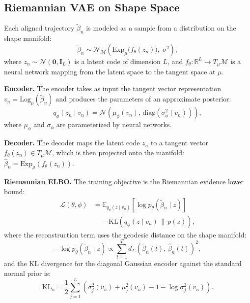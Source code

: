 \documentclass{article}
\begin{document}
\subsection{Riemannian VAE on Shape Space}
\label{sec:rvae}

Each aligned trajectory $\tilde{\beta}_n$ is modeled as a sample from a distribution on the shape manifold:
\begin{equation}
\tilde{\beta}_n \sim \mathcal{N}_{\mathcal{M}}\!\left(\mathrm{Exp}_\mu\!\big(f_\theta(z_n)\big),\; \sigma^2\right),
\end{equation}
where $z_n \sim \mathcal{N}(\mathbf{0}, \mathbf{I}_L)$ is a latent code of dimension $L$, and $f_\theta: \mathbb{R}^L \to T_\mu \mathcal{M}$ is a neural network mapping from the latent space to the tangent space at $\mu$.

\textbf{Encoder.} The encoder takes as input the tangent vector representation $v_n = \mathrm{Log}_\mu(\tilde{\beta}_n)$ and produces the parameters of an approximate posterior:
\begin{equation}
q_\phi(z_n \mid v_n) = \mathcal{N}\!\left(\mu_\phi(v_n),\, \mathrm{diag}(\sigma^2_\phi(v_n))\right),
\end{equation}
where $\mu_\phi$ and $\sigma_\phi$ are parameterized by neural networks.

\textbf{Decoder.} The decoder maps the latent code $z_n$ to a tangent vector $f_\theta(z_n) \in T_\mu \mathcal{M}$, which is then projected onto the manifold: $\hat{\beta}_n = \mathrm{Exp}_\mu(f_\theta(z_n))$.

\textbf{Riemannian ELBO.} The training objective is the Riemannian evidence lower bound:
\begin{equation}
\begin{aligned}
\mathcal{L}(\theta,\phi) &= \mathbb{E}_{q_\phi(z \mid v_n)}\!\left[\log p_\theta(\tilde{\beta}_n \mid z)\right] \\
&\quad - \mathrm{KL}\!\left(q_\phi(z \mid v_n) \,\|\, p(z)\right),
\end{aligned}
\label{eq:elbo}
\end{equation}
where the reconstruction term uses the geodesic distance on the shape manifold:
\begin{equation}
-\log p_\theta(\tilde{\beta}_n \mid z) \propto \sum_{t=1}^{T} d_\Sigma\!\left(\tilde{\beta}_n(t),\, \hat{\beta}_n(t)\right)^2,
\label{eq:recon}
\end{equation}
and the KL divergence for the diagonal Gaussian encoder against the standard normal prior is:
\begin{equation}
\mathrm{KL}_n = \frac{1}{2}\sum_{j=1}^{L}\left(\sigma_j^2(v_n) + \mu_j^2(v_n) - 1 - \log \sigma_j^2(v_n)\right).
\label{eq:kl}
\end{equation}
\end{document}
